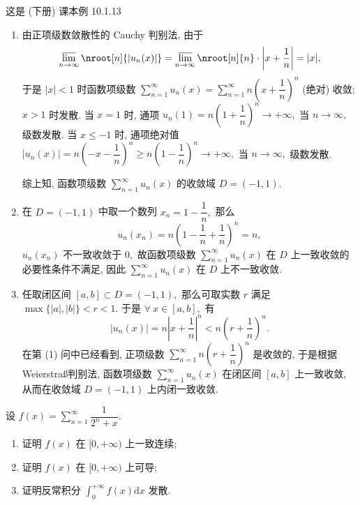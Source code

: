 \begin{solution}
  这是 (下册) 课本例 10.1.13

  \begin{enumerate}
    \item 由正项级数敛散性的 Cauchy 判别法, 由于
    $$\varlimsup_{n\to\infty} \nroot[n]{\lvert u_n(x) \rvert} = \varlimsup_{n\to\infty} \nroot[n]{n} \cdot \left\lvert x + \dfrac{1}{n} \right\rvert = \lvert x \rvert,$$
    于是 $\lvert x \rvert < 1$ 时函数项级数 $\sum\limits_{n=1}^{\infty} u_n(x) = \sum\limits_{n=1}^{\infty} n \left( x + \dfrac{1}{n} \right)^n$ (绝对) 收敛; $x > 1$ 时发散. 当 $x = 1$ 时, 通项 $u_n(1) = n \left( 1 + \dfrac{1}{n} \right)^n \to +\infty,$ 当 $n \to \infty,$ 级数发散. 当 $x \leqslant -1$ 时, 通项绝对值 $\lvert u_n(x) \rvert = n \left( -x - \dfrac{1}{n} \right)^n \geqslant n \left( 1 - \dfrac{1}{n} \right)^n \to +\infty,$ 当 $n \to \infty,$ 级数发散.

    综上知, 函数项级数 $\sum\limits_{n=1}^{\infty} u_n(x)$ 的收敛域 $D = (-1, 1).$
    \item 在 $D = (-1, 1)$ 中取一个数列 $x_n = 1 - \dfrac{1}{n},$ 那么
    $$u_n(x_n) = n \left( 1 - \dfrac{1}{n} + \dfrac{1}{n} \right)^n = n,$$
    $u_n(x_n)$ 不一致收敛于 $0,$ 故函数项级数 $\sum\limits_{n=1}^{\infty} u_n(x)$ 在 $D$ 上一致收敛的必要性条件不满足, 因此 $\sum\limits_{n=1}^{\infty} u_n(x)$ 在 $D$ 上不一致收敛.
    \item 任取闭区间 $[a, b] \subset D = (-1, 1),$ 那么可取实数 $r$ 满足 $\max\{\lvert a \rvert, \lvert b \rvert\} < r < 1.$ 于是 $\forall ~ x \in [a, b],$ 有
    $$\lvert u_n(x) \rvert = n \left\lvert x + \dfrac{1}{n} \right\rvert^n < n \left( r + \dfrac{1}{n} \right)^n.$$
    在第 (1) 问中已经看到, 正项级数 $\sum\limits_{n=1}^{\infty} n \left( r + \dfrac{1}{n} \right)^n$ 是收敛的, 于是根据 Weierstra\ss 判别法, 函数项级数 $\sum\limits_{n=1}^{\infty} u_n(x)$ 在闭区间 $[a, b]$ 上一致收敛, 从而在收敛域 $D = (-1, 1)$ 上内闭一致收敛.
  \end{enumerate}
\end{solution}

\begin{question}[points = 10]
  设 $f(x) = \sum\limits_{n=1}^\infty \dfrac{1}{2^n + x}.$
  \begin{enumerate}
    \item 证明 $f(x)$ 在 $[0, +\infty)$ 上一致连续;
    \item 证明 $f(x)$ 在 $[0, +\infty)$ 上可导;
    \item 证明反常积分 $\int_0^{+\infty} f(x) \mathrm{d} x$ 发散.
  \end{enumerate}

\end{question}

